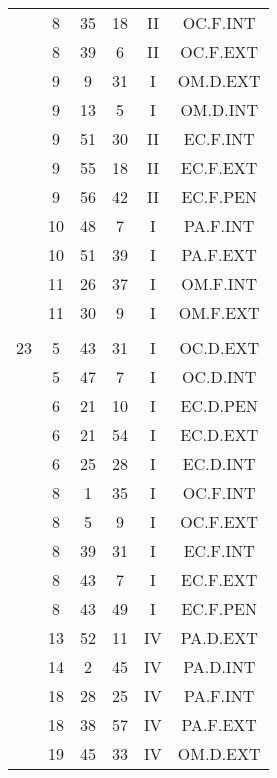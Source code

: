 \documentclass[12pt, a4paper]{article}
\begin{document}
\begin{multicols}{3}
{\begin{tabular}{c c c c c c}
	 	 	 	 & 8 & 35 & 18 & II & OC.F.INT\\%
	 	 	 	 & 8 & 39 & 6 & II & OC.F.EXT\\%
	 	 	 	 & 9 & 9 & 31 & I & OM.D.EXT\\%
	 	 	 	 & 9 & 13 & 5 & I & OM.D.INT\\%
	 	 	 	 & 9 & 51 & 30 & II & EC.F.INT\\%
	 	 	 	 & 9 & 55 & 18 & II & EC.F.EXT\\%
	 	 	 	 & 9 & 56 & 42 & II & EC.F.PEN\\%
	 	 	 	 & 10 & 48 & 7 & I & PA.F.INT\\%
	 	 	 	 & 10 & 51 & 39 & I & PA.F.EXT\\%
	 	 	 	 & 11 & 26 & 37 & I & OM.F.INT\\%
	 	 	 	 & 11 & 30 & 9 & I & OM.F.EXT\\%
	 	 	 	 & & & & & \\%
	 	 	 	23 & 5 & 43 & 31 & I & OC.D.EXT\\%
	 	 	 	 & 5 & 47 & 7 & I & OC.D.INT\\%
	 	 	 	 & 6 & 21 & 10 & I & EC.D.PEN\\%
	 	 	 	 & 6 & 21 & 54 & I & EC.D.EXT\\%
	 	 	 	 & 6 & 25 & 28 & I & EC.D.INT\\%
	 	 	 	 & 8 & 1 & 35 & I & OC.F.INT\\%
	 	 	 	 & 8 & 5 & 9 & I & OC.F.EXT\\%
	 	 	 	 & 8 & 39 & 31 & I & EC.F.INT\\%
	 	 	 	 & 8 & 43 & 7 & I & EC.F.EXT\\%
	 	 	 	 & 8 & 43 & 49 & I & EC.F.PEN\\%
	 	 	 	 & 13 & 52 & 11 & IV & PA.D.EXT\\%
	 	 	 	 & 14 & 2 & 45 & IV & PA.D.INT\\%
	 	 	 	 & 18 & 28 & 25 & IV & PA.F.INT\\%
	 	 	 	 & 18 & 38 & 57 & IV & PA.F.EXT\\%
	 	 	 	 & 19 & 45 & 33 & IV & OM.D.EXT\\%
	 	 \end{tabular}
 	}
\end{multicols}
\end{document}
